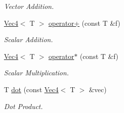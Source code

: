 \begin{DoxyCompactItemize}
\begin{DoxyCompactList}\small\item\em Vector Addition. \item\end{DoxyCompactList}\item 
\hypertarget{classMath_1_1Vec4_a4f5cdfe8a3bd07f3a49c7f17f68768d9}{
\hyperlink{classMath_1_1Vec4}{Vec4}$<$ T $>$ \hyperlink{classMath_1_1Vec4_a4f5cdfe8a3bd07f3a49c7f17f68768d9}{operator+} (const T \&f)}
\label{classMath_1_1Vec4_a4f5cdfe8a3bd07f3a49c7f17f68768d9}

\begin{DoxyCompactList}\small\item\em Scalar Addition. \item\end{DoxyCompactList}\item 
\hypertarget{classMath_1_1Vec4_a3b813dd370cc2468ab8ed945ac84bd8e}{
\hyperlink{classMath_1_1Vec4}{Vec4}$<$ T $>$ \hyperlink{classMath_1_1Vec4_a3b813dd370cc2468ab8ed945ac84bd8e}{operator$\ast$} (const T \&f)}
\label{classMath_1_1Vec4_a3b813dd370cc2468ab8ed945ac84bd8e}

\begin{DoxyCompactList}\small\item\em Scalar Multiplication. \item\end{DoxyCompactList}\item 
\hypertarget{classMath_1_1Vec4_a366b120f3b6af62c3aa1ff63bf0bb71e}{
T \hyperlink{classMath_1_1Vec4_a366b120f3b6af62c3aa1ff63bf0bb71e}{dot} (const \hyperlink{classMath_1_1Vec4}{Vec4}$<$ T $>$ \&vec)}
\label{classMath_1_1Vec4_a366b120f3b6af62c3aa1ff63bf0bb71e}

\begin{DoxyCompactList}\small\item\em Dot Product. \item\end{DoxyCompactList}\end{DoxyCompactItemize}
